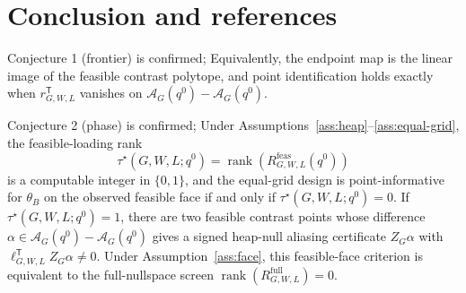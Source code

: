 \documentclass[11pt]{article}
\newcommand{\transpose}{\mathsf{T}}
\theoremstyle{definition}
\theoremstyle{plain}
\theoremstyle{remark}
\begin{document}
\section{Conclusion and references}
Conjecture 1 (frontier) is confirmed; Equivalently, the endpoint map is the linear image of the feasible contrast polytope, and point identification holds exactly when \(r_{G,W,L}^{\transpose}\) vanishes on \(\mathcal{A}_G(q^0)-\mathcal{A}_G(q^0)\).

Conjecture 2 (phase) is confirmed; Under Assumptions~\ref{ass:heap}--\ref{ass:equal-grid}, the feasible-loading rank
\[
\tau^\star(G,W,L;q^0)=\operatorname{rank}(R^{\mathrm{feas}}_{G,W,L}(q^0))
\]
is a computable integer in \(\{0,1\}\), and the equal-grid design is point-informative for \(\theta_B\) on the observed feasible face if and only if \(\tau^\star(G,W,L;q^0)=0\). If \(\tau^\star(G,W,L;q^0)=1\), there are two feasible contrast points whose difference \(\alpha\in\mathcal{A}_G(q^0)-\mathcal{A}_G(q^0)\) gives a signed heap-null aliasing certificate \(Z_G\alpha\) with \(\ell_{G,W,L}^{\transpose}Z_G\alpha\neq0\). Under Assumption~\ref{ass:face}, this feasible-face criterion is equivalent to the full-nullspace screen \(\operatorname{rank}(R^{\mathrm{full}}_{G,W,L})=0\).
\end{document}
